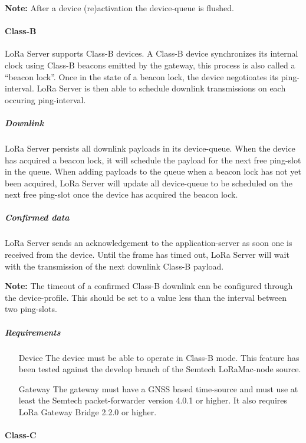 \textbf{Note:}
	After a device (re)activation the device-queue is flushed.




\paragraph{Class-B}
LoRa Server supports Class-B devices.
A Class-B device synchronizes its internal clock using Class-B beacons emitted by the gateway,
	this process is also called a “beacon lock”.
Once in the state of a beacon lock,
	the device negotioates its ping-interval.
LoRa Server is then able to schedule downlink transmissions on each occuring ping-interval.

\subparagraph{Downlink}
LoRa Server persists all downlink payloads in its device-queue.
When the device has acquired a beacon lock,
	it will schedule the payload for the next free ping-slot in the queue.
When adding payloads to the queue when a beacon lock has not yet been acquired,
	LoRa Server will update all device-queue to be scheduled on the next free ping-slot once the device has acquired the beacon lock.

\subparagraph{Confirmed data}
LoRa Server sends an acknowledgement to the application-server as soon one is received from the device.
Until the frame has timed out,
	LoRa Server will wait with the transmission of the next downlink Class-B payload.

\textbf{Note:} The timeout of a confirmed Class-B downlink can be configured through the device-profile.
This should be set to a value less than the interval between two ping-slots.

\subparagraph{Requirements}

\begin{itemize}
	\item[Device]
	The device must be able to operate in Class-B mode.
This feature has been tested against the develop branch of the Semtech LoRaMac-node source.
	\item[Gateway]
	The gateway must have a GNSS based time-source and must use at least the Semtech packet-forwarder version 4.0.1 or higher.
It also requires LoRa Gateway Bridge 2.2.0 or higher.

\end{itemize}


\paragraph{Class-C}


